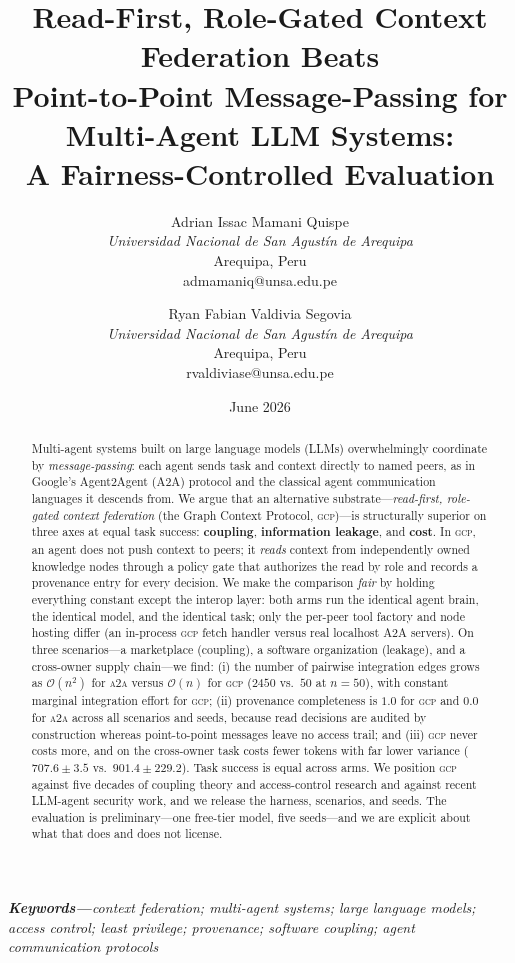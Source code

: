\documentclass[10pt,twocolumn,letterpaper]{article}
\title{\textbf{Read-First, Role-Gated Context Federation Beats\\
Point-to-Point Message-Passing for Multi-Agent LLM Systems:\\
A Fairness-Controlled Evaluation}}
\author{%
Adrian Issac Mamani Quispe\\
\textit{Universidad Nacional de San Agust\'in de Arequipa}\\
Arequipa, Peru\\
admamaniq@unsa.edu.pe
\and
Ryan Fabian Valdivia Segovia\\
\textit{Universidad Nacional de San Agust\'in de Arequipa}\\
Arequipa, Peru\\
rvaldiviase@unsa.edu.pe
}
\date{June 2026}
\newcommand{\gcp}{\textsc{gcp}}
\newcommand{\ata}{\textsc{a2a}}
\newcommand{\bigoh}{\mathcal{O}}
\begin{document}
\maketitle

\begin{abstract}
Multi-agent systems built on large language models (LLMs) overwhelmingly coordinate by
\emph{message-passing}: each agent sends task and context directly to named peers, as in
Google's Agent2Agent (A2A) protocol and the classical agent communication languages it
descends from. We argue that an alternative substrate---\emph{read-first, role-gated context
federation} (the Graph Context Protocol, \gcp{})---is structurally superior on three axes at
equal task success: \textbf{coupling}, \textbf{information leakage}, and \textbf{cost}. In
\gcp{}, an agent does not push context to peers; it \emph{reads} context from independently
owned knowledge nodes through a policy gate that authorizes the read by role and records a
provenance entry for every decision. We make the comparison \emph{fair} by holding everything
constant except the interop layer: both arms run the identical agent brain, the identical model,
and the identical task; only the per-peer tool factory and node hosting differ (an in-process
\gcp{} fetch handler versus real localhost A2A servers). On three scenarios---a marketplace
(coupling), a software organization (leakage), and a cross-owner supply chain---we find: (i) the
number of pairwise integration edges grows as $\bigoh(n^2)$ for \ata{} versus $\bigoh(n)$ for
\gcp{} ($2450$ vs.\ $50$ at $n{=}50$), with constant marginal integration effort for \gcp{};
(ii) provenance completeness is $1.0$ for \gcp{} and $0.0$ for \ata{} across all scenarios and
seeds, because read decisions are audited by construction whereas point-to-point messages leave
no access trail; and (iii) \gcp{} never costs more, and on the cross-owner task costs fewer
tokens with far lower variance ($707.6{\pm}3.5$ vs.\ $901.4{\pm}229.2$). Task success is equal
across arms. We position \gcp{} against five decades of coupling theory and access-control
research and against recent LLM-agent security work, and we release the harness, scenarios, and
seeds. The evaluation is preliminary---one free-tier model, five seeds---and we are explicit
about what that does and does not license.
\end{abstract}

\smallskip
\noindent\textbf{\textit{Keywords---}}\textit{context federation; multi-agent
systems; large language models; access control; least privilege; provenance;
software coupling; agent communication protocols}
\smallskip
\end{document}
